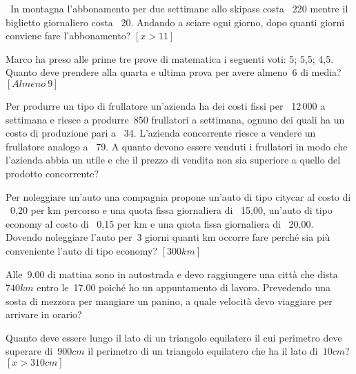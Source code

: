 \begin{multicols}{2}
 \begin{esercizio}[\Ast]
 \label{ese:21.23}
 \ In montagna l'abbonamento per due settimane allo
skipass costa \officialeuro\ 220 mentre il biglietto giornaliero costa
\officialeuro\ 20. Andando a sciare ogni giorno, dopo quanti giorni
conviene fare l'abbonamento? \hfill $\left[x>11\right]$
 \end{esercizio}

 \begin{esercizio}[\Ast]
 \label{ese:21.24}
 Marco ha preso alle prime tre prove di matematica i seguenti voti: 5;
5,5; 4,5. Quanto deve prendere alla quarta e ultima prova per avere almeno~6
di media? \hfill $\left[Almeno~9\right]$
 \end{esercizio}

 \begin{esercizio}
 \label{ese:21.25}
 Per produrre un tipo di frullatore un'azienda ha dei
costi fissi per \officialeuro\ 12\,000 a settimana e riesce a produrre~850
frullatori a settimana, ognuno dei quali ha un costo di produzione pari
a \officialeuro\ 34. L'azienda concorrente riesce a
vendere un frullatore analogo a \officialeuro\ 79. A quanto devono essere
venduti i frullatori in modo che l'azienda abbia un
utile e che il prezzo di vendita non sia superiore a quello del
prodotto concorrente?
 \end{esercizio}

 \begin{esercizio}[\Ast]
 \label{ese:21.26}
 Per noleggiare un'auto una compagnia propone
un'auto di tipo citycar al costo di \officialeuro\ 0,20 per km percorso e una 
quota fissa giornaliera
di \officialeuro\ 15,00,
un'auto di tipo economy al costo di \officialeuro\ 0,15
per km e una quota fissa giornaliera di \officialeuro\ 20,00. Dovendo
noleggiare l'auto per~3 giorni quanti km occorre fare
perché sia più conveniente l'auto di tipo economy?
 \hfill $\left[300\unit{km}\right]$
 \end{esercizio}

 \begin{esercizio}
 \label{ese:21.27}
 Alle~9.00 di mattina sono in autostrada e devo raggiungere una città
che dista~$740\unit{km}$ entro le~17.00 poiché ho un appuntamento di lavoro.
Prevedendo una sosta di mezzora per mangiare un panino, a quale
velocità devo viaggiare per arrivare in orario?
 \end{esercizio}

 \begin{esercizio}[\Ast]
 \label{ese:21.28}
 Quanto deve essere lungo il lato di un triangolo equilatero il cui
perimetro deve superare di~$900\unit{cm}$ il perimetro di un triangolo
equilatero che ha il lato di~$10\unit{cm}$? 
\hfill $\left[x>310\unit{cm}\right]$
 \end{esercizio}


\end{multicols}
